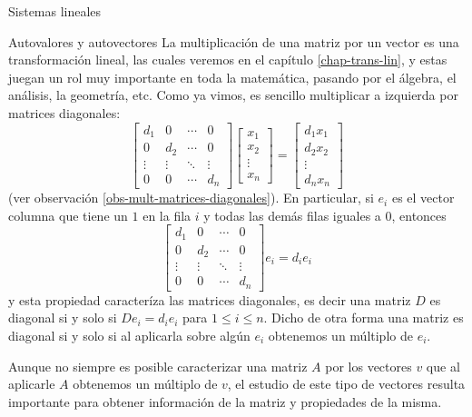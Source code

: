 \documentclass[a4paper,12pt,twoside,spanish,reqno]{amsbook}
\numberwithin{equation}{section}
\theoremstyle{definition}
\theoremstyle{remark}
\begin{document}
\begin{chapter}{Sistemas lineales}
\begin{section}{Autovalores y autovectores}
    La multiplicación de una matriz por  un vector es una transformación lineal, las cuales veremos en el capítulo \ref{chap-trans-lin}, y estas juegan un rol muy importante en toda la matemática, pasando por el álgebra, el análisis, la geometría, etc.  Como ya vimos, es sencillo multiplicar a izquierda por matrices diagonales:
    \begin{equation*}
        \begin{bmatrix}
            d_1 & 0 & \cdots &0 \\
            0 & d_2 & \cdots &0 \\
            \vdots & \vdots & \ddots &\vdots \\
            0 & 0 & \cdots & d_n 
            \end{bmatrix}
        \begin{bmatrix}
            x_1\\x_2 \\\vdots \\x_n
        \end{bmatrix}
        = \begin{bmatrix}
            d_1x_1\\d_2x_2 \\\vdots \\d_nx_n
        \end{bmatrix}
    \end{equation*} 
    (ver observación \ref{obs-mult-matrices-diagonales}). En particular,  si $e_i$  es el vector columna  que tiene un $1$ en la fila $i$ y todas las demás filas iguales a $0$,  entonces
    \begin{equation*}
        \begin{bmatrix}
            d_1 & 0 & \cdots &0 \\
            0 & d_2 & \cdots &0 \\
            \vdots & \vdots & \ddots &\vdots \\
            0 & 0 & \cdots & d_n 
            \end{bmatrix}
        e_i
        = d_ie_i
    \end{equation*} 
    y esta propiedad caracteríza las matrices diagonales, es decir una matriz $D$ es diagonal si  y solo si $De_i =d_ie_i$ para $1 \le i \le n$. Dicho de  otra forma una matriz es diagonal si y solo si  al aplicarla sobre algún $e_i$ obtenemos un múltiplo de $e_i$. 

    Aunque no siempre es posible caracterizar una matriz $A$  por los vectores $v$ que  al aplicarle $A$  obtenemos un múltiplo de $v$,  el estudio de este tipo de vectores  resulta importante para obtener información de la matriz y propiedades de la misma.  
    

\end{section}
\end{chapter}
\end{document}
